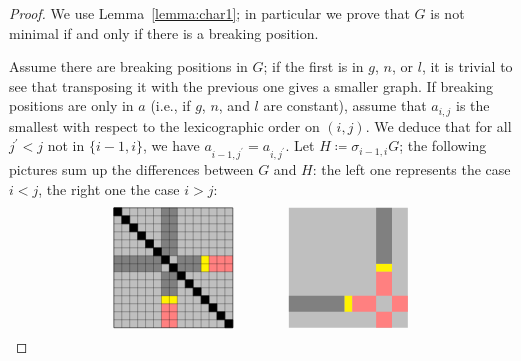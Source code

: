 \documentclass{amsart}
\theoremstyle{plain}
\theoremstyle{definition}
\begin{document}
\begin{proof}
  We use Lemma~\ref{lemma:char1}; in particular we prove that $G$ is
  not minimal if and only if there is a breaking position.

  Assume there are breaking positions in $G$; if the first is in $g$,
  $n$, or $l$, it is trivial to see that transposing it with the
  previous one gives a smaller graph. If breaking positions are only
  in $a$ (i.e., if $g$, $n$, and $l$ are constant), assume that
  $a_{i,j}$ is the smallest with respect to the lexicographic order on
  $(i,j)$. We deduce that for all $j^\prime < j$ not in $\{i-1,i\}$,
  we have $a_{i-1, j^\prime} = a_{i, j^\prime}$. %
  Let $H \coloneqq \sigma_{i-1,i} G$; the
  following pictures sum up the differences between $G$ and $H$: the
  left one represents the case $i < j$, the right one the case $i >
  j$:
  \[
  \begin{tikzpicture}[xscale=0.2,yscale=-0.2,baseline=-40]
    \fill [gray!50] (0,0) -- (15,0) -- (15,15) -- (0,15) -- cycle;
    \fill [yellow] (12,6) -- (12,8) -- (11,8) -- (11,6) -- cycle;
    \fill [yellow] (6,12) -- (8,12) -- (8,11) -- (6,11) -- cycle;
    \fill [red!50] (12,6) -- (12,8) -- (15,8) -- (15,6) -- cycle;
    \fill [red!50] (6,12) -- (8,12) -- (8,15) -- (6,15) -- cycle;
    \fill [gray] (0,6) -- (0,8) -- (11,8) -- (11,6) -- cycle;
    \fill [gray] (6,0) -- (8,0) -- (8,11) -- (6,11) -- cycle;
    \fill [gray!50] (6,6) -- (6,8) -- (8,8) -- (8,6) -- cycle;

    \draw (0,0) -- (15,0) -- (15,15) -- (0,15) -- cycle;
    \foreach \x in {1,2,...,14}
    {
      \draw [very thin] (0,\x) -- (15,\x);
      \draw [very thin] (\x,0) -- (\x,15);
    }
    \foreach \x in {0,1,...,14}
      \filldraw (\x,\x) -- (\x,\x+1) -- (\x+1,\x+1) -- (\x+1,\x) -- cycle;
  \end{tikzpicture}
  \qquad\qquad
  \begin{tikzpicture}[xscale=0.2,yscale=-0.2,baseline=-40]
    \fill [gray!50] (0,0) -- (15,0) -- (15,15) -- (0,15) -- cycle;
    \fill [yellow] (7,13) -- (8,13) -- (8,11) -- (7,11) -- cycle;
    \fill [yellow] (13,7) -- (13,8) -- (11,8) -- (11,7) -- cycle;
    \fill [red!50] (8,11) -- (8,13) -- (15,13) -- (15,11) -- cycle;
    \fill [red!50] (11,8) -- (13,8) -- (13,15) -- (11,15) -- cycle;
    \fill [gray] (0,11) -- (0,13) -- (7,13) -- (7,11) -- cycle;
    \fill [gray] (11,0) -- (13,0) -- (13,7) -- (11,7) -- cycle;
    \fill [gray!50] (11,11) -- (11,13) -- (13,13) -- (13,11) -- cycle;


\end{tikzpicture}\]
\end{proof}
\end{document}
